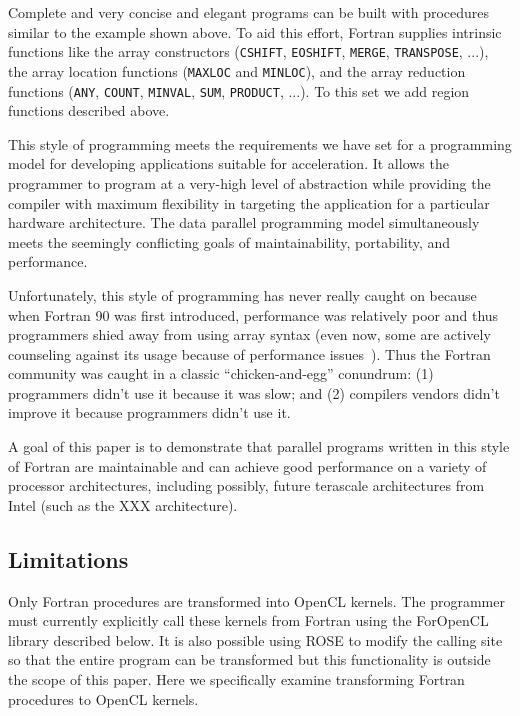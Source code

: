 Complete and very concise and elegant programs can be built with procedures
similar to the example shown above. To aid this effort, Fortran
supplies intrinsic functions like the array constructors (\texttt{CSHIFT},
\texttt{EOSHIFT}, \texttt{MERGE}, \texttt{TRANSPOSE}, ...), the array location
functions (\texttt{MAXLOC} and \texttt{MINLOC}), and the array reduction
functions (\texttt{ANY}, \texttt{COUNT}, \texttt{MINVAL}, \texttt{SUM},
\texttt{PRODUCT}, ...).  To this set we add region functions described above.

This style of programming meets the requirements we have set for a programming
model for developing applications suitable for acceleration.  It allows the programmer to
program at a very-high level of abstraction while providing the compiler with
maximum flexibility in targeting the application for a particular hardware
architecture.  The data parallel programming model simultaneously meets the
seemingly conflicting goals of maintainability, portability, and performance.

Unfortunately, this style of programming has never really caught on because
when Fortran 90 was first introduced, performance was relatively poor and thus
programmers shied away from using array syntax (even now, some are actively
counseling against its usage because of performance issues~\cite{Cray-SC07}).
Thus the Fortran community was caught in a classic ``chicken-and-egg''
conundrum: (1) programmers didn't use it because it was slow; and (2)
compilers vendors didn't improve it because programmers didn't use it.

A goal of this paper is to demonstrate that parallel programs written in
this style of Fortran are maintainable and can achieve good performance on a
variety of processor architectures, including possibly, future terascale
architectures from Intel (such as the XXX architecture).

\subsection{Limitations}

Only Fortran procedures are transformed into OpenCL kernels.  The programmer
must currently explicitly call these kernels from Fortran using the ForOpenCL
library described below.  It is also possible using ROSE to modify the calling
site so that the entire program can be transformed but this functionality is
outside the scope of this paper.  Here we specifically examine transforming
Fortran procedures to OpenCL kernels.

